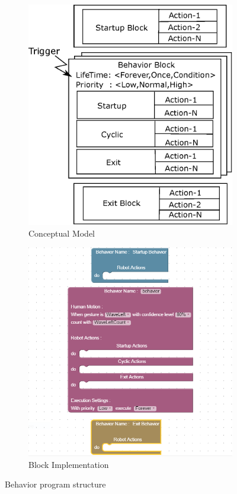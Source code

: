 \begin{figure}
\centering
\begin{subfigure}[t]{0.48\textwidth}
\includegraphics[width=\textwidth]{../thesis/assets/program_structure.eps}
\caption[Conceptual Model]{Conceptual Model}
\label{fig:program_concept}
\end{subfigure}
\begin{subfigure}[t]{0.48\textwidth}
\includegraphics[width=\textwidth]{../thesis/assets/program_block.png}
\caption[Block Implementation]{Block Implementation}
\label{fig:program_blocks}
\end{subfigure}
\caption[Program Structure]{Behavior program structure}
\label{fig:program}
\end{figure}
